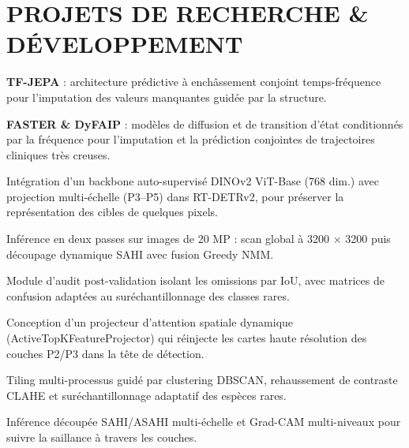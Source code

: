 \section{PROJETS DE RECHERCHE \& DÉVELOPPEMENT}
\begin{cvitems}
  \item \textbf{TF-JEPA} : architecture prédictive à enchâssement conjoint temps-fréquence pour l’imputation des valeurs manquantes guidée par la structure.
  \item \textbf{FASTER \& DyFAIP} : modèles de diffusion et de transition d’état conditionnés par la fréquence pour l’imputation et la prédiction conjointes de trajectoires cliniques très creuses.
\end{cvitems}

\begin{cvitems}
  \item Intégration d’un backbone auto-supervisé DINOv2 ViT-Base (768 dim.) avec projection multi-échelle (P3–P5) dans RT-DETRv2, pour préserver la représentation des cibles de quelques pixels.
  \item Inférence en deux passes sur images de 20 MP : scan global à 3200 $\times$ 3200 puis découpage dynamique SAHI avec fusion Greedy NMM.
  \item Module d’audit post-validation isolant les omissions par IoU, avec matrices de confusion adaptées au suréchantillonnage des classes rares.
\end{cvitems}

\begin{cvitems}
  \item Conception d’un projecteur d’attention spatiale dynamique (ActiveTopKFeatureProjector) qui réinjecte les cartes haute résolution des couches P2/P3 dans la tête de détection.
  \item Tiling multi-processus guidé par clustering DBSCAN, rehaussement de contraste CLAHE et suréchantillonnage adaptatif des espèces rares.
  \item Inférence découpée SAHI/ASAHI multi-échelle et Grad-CAM multi-niveaux pour suivre la saillance à travers les couches.
\end{cvitems}

